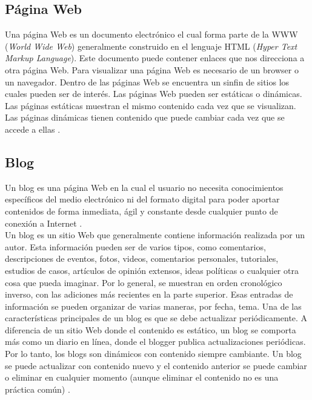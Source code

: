 
\subsection{Página Web}

Una página Web es un documento electrónico el cual forma parte de la WWW (\textit{World Wide Web}) generalmente 
construido en el lenguaje HTML (\textit{Hyper Text Markup Language}). Este documento puede contener enlaces que nos 
direcciona a otra página Web. Para visualizar una página Web es necesario de un browser o un navegador. 
Dentro de las páginas Web se encuentra un sinfin de sitios los cuales pueden ser de interés. 
Las páginas Web pueden ser estáticas o dinámicas. Las páginas estáticas muestran el mismo contenido cada vez que se 
visualizan. Las páginas dinámicas tienen contenido que puede cambiar cada vez que se accede a ellas \citep{CTpW}. 


\subsection{Blog}

Un blog es una página Web en la cual el usuario no necesita conocimientos específicos del medio electrónico ni del 
formato digital para poder aportar contenidos de forma inmediata, ágil y constante desde cualquier punto de conexión 
a Internet \citep{CT17}. \\
Un blog es un sitio Web que generalmente contiene información realizada por un autor. Esta información pueden ser de varios 
tipos, como comentarios, descripciones de eventos, fotos, videos, comentarios personales, tutoriales, estudios de casos, artículos 
de opinión extensos, ideas políticas o cualquier otra cosa que pueda imaginar. Por lo general, se muestran en orden cronológico 
inverso, con las adiciones más recientes en la parte superior. Esas entradas de información se pueden organizar de varias maneras, por fecha, tema. 
Una de las características principales de un blog es que se debe actualizar periódicamente. A diferencia de un sitio Web donde el 
contenido es estático, un blog se comporta más como un diario en línea, donde el blogger publica actualizaciones periódicas. Por lo 
tanto, los blogs son dinámicos con contenido siempre cambiante. Un blog se puede actualizar con contenido nuevo y el contenido anterior se 
puede cambiar o eliminar en cualquier momento (aunque eliminar el contenido no es una práctica común) \citep{CTBlog}.

